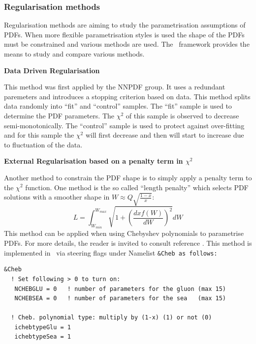 \subsubsection{Regularisation methods}

Regularisation methods are aiming to study the parametrisation assumptions of PDFs. 
When more flexible parametrisation styles is used the shape of the PDFs must be constrained and various methods are used.
The \fitter\ framework provides the means to study and compare various methods.


\begin{description}

\item \bf{Data Driven Regularisation}\rm

This method was first applied by the NNPDF group.
It uses a redundant paremeters and introduces a stopping criterion based on data. This method splits data randomly
into ``fit'' and ``control''  samples. The ``fit'' sample is used to determine the PDF parameters. 
The $\chi^2$ of this sample is observed to decrease semi-monotonically. 
The ``control'' sample is used to protect against over-fitting and for this sample the $\chi^2$ will first decrease 
and then will start to increase due to fluctuation of the data.


\item \bf{External Regularisation based on a penalty term in $\chi^2$} \rm

Another method to constrain the PDF shape is to simply apply a penalty term
to the $\chi^2$ function. 
One method is the so called ``length penalty'' which selects PDF solutions with a smoother shape in $W\approx Q\sqrt{\frac{1-x}{x}}$:
\begin{equation}
L=\int_{W_{min}}^{W_{max}} \sqrt{1+\left(\frac{dxf(W)}{dW}\right)^2}dW
\end{equation}
This method can be applied when using Chebyshev polynomials to parametrise PDFs.
For more details, the reader is invited to consult  reference \cite{Chebyshev}.
This method is implemented in \fitter\ via steering flags under Namelist \tt \&Cheb \rm as follows:
\begin{verbatim}
&Cheb
  ! Set following > 0 to turn on:
   NCHEBGLU = 0   ! number of parameters for the gluon (max 15)
   NCHEBSEA = 0   ! number of parameters for the sea   (max 15)

  ! Cheb. polynomial type: multiply by (1-x) (1) or not (0)  
   ichebtypeGlu = 1 
   ichebtypeSea = 1 


\end{verbatim}
\end{description}
